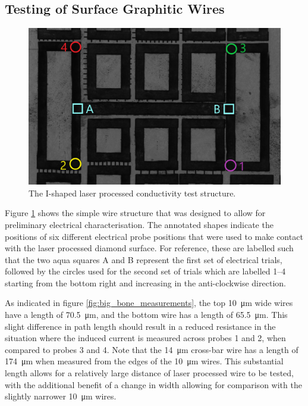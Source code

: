 \begin{refsection}
\section{Testing of Surface Graphitic Wires}
\label{subsec:testing_of_surface_graphitic_wires}
\begin{figure}[H]
    \centering
    \includegraphics[width=\linewidth]{Chapter7/Figs/Raster/big_bone_esid_annotated.jpg}
    \caption{The I-shaped laser processed conductivity test structure.}
    \label{fig:big_bone_esid}
\end{figure}
Figure \ref{fig:big_bone_esid} shows the simple wire structure that was designed to allow for preliminary electrical characterisation. The annotated shapes indicate the positions of six different electrical probe positions that were used to make contact with the laser processed diamond surface. For reference, these are labelled such that the two aqua squares A and B represent the first set of electrical trials, followed by the circles used for the second set of trials which are labelled 1--4 starting from the bottom right and increasing in the anti-clockwise direction.

As indicated in figure \ref{fig:big_bone_measurements}, the top 10~\si{\micro\metre} wide wires have a length of 70.5~\si{\micro\metre}, and the bottom wire has a length of 65.5~\si{\micro\metre}. This slight difference in path length should result in a reduced resistance in the situation where the induced current is measured across probes 1 and 2, when compared to probes 3 and 4. Note that the 14~\si{\micro\metre} cross-bar wire has a length of 174~\si{\micro\metre} when measured from the edges of the 10~\si{\micro\metre} wires. This substantial length allows for a relatively large distance of laser processed wire to be tested, with the additional benefit of a change in width allowing for comparison with the slightly narrower 10~\si{\micro\metre} wires.
\clearpage

\end{refsection}
